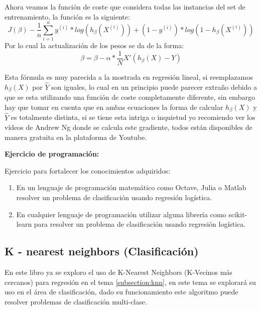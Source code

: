 \documentclass[11pt,fleqn]{book} %
\begin{document}
Ahora veamos la función de coste que considera todas las instancias del set de entrenamiento, la función es la siguiente:
\begin{equation}
J(\beta) -\frac{1}{n} \sum_{i=1}^{n} y^{(i)}*log(h_\beta(X^{(i)}) ) + (1-y^{(i)})*log(1-h_\beta(X^{(i)}) )
\label{eqn:logistic_regression_fgradient_descent} 
\end{equation}
Por lo cual la actualización de los pesos se da de la forma:
\begin{equation}
\label{eqn:logistic_regression_gradient_descent2}
\beta = \beta - \alpha * \frac{1}{N} X' (h_\beta(X)-Y)
\end{equation}

Esta fórmula es muy parecida a la mostrada en regresión lineal, si reemplazamos $h_\beta(X)$ por $\hat{Y}$ son iguales, lo cual en un principio puede parecer extraño debido a que se esta utilizando una función de coste completamente diferente, sin embargo hay que tomar en cuenta que en ambas ecuaciones la forma de calcular $h_\beta(X)$ y $\hat{Y}$ es totalmente distinta, si se tiene esta intriga o inquietud yo recomiendo ver los vídeos de Andrew Ng donde se calcula este gradiente, todos están disponibles de manera gratuita en la plataforma de Youtube.

\clearpage

\textbf{Ejercicio de programación:}

Ejercicio para fortalecer los conocimientos adquiridos:

\begin{enumerate}
\item En un lenguaje de programación matemático como Octave, Julia o Matlab resolver un problema de clasificación usando regresión logística.
\item En cualquier lenguaje de programación utilizar alguna librería como scikit-learn para resolver un problema de clasificación usando regresión logística.
\end{enumerate}

\subsection{K - nearest neighbors (Clasificación)} 
\label{subsection:knn_csn}

En este libro ya se exploro el uso de  K-Nearest Neighbors (K-Vecinos más cercanos) para regresión en el tema \ref{subsection:knn}, en este tema se explorará su uso en el área de clasificación, dado su funcionamiento este algoritmo puede resolver problemas de clasificación multi-clase.
\end{document}
